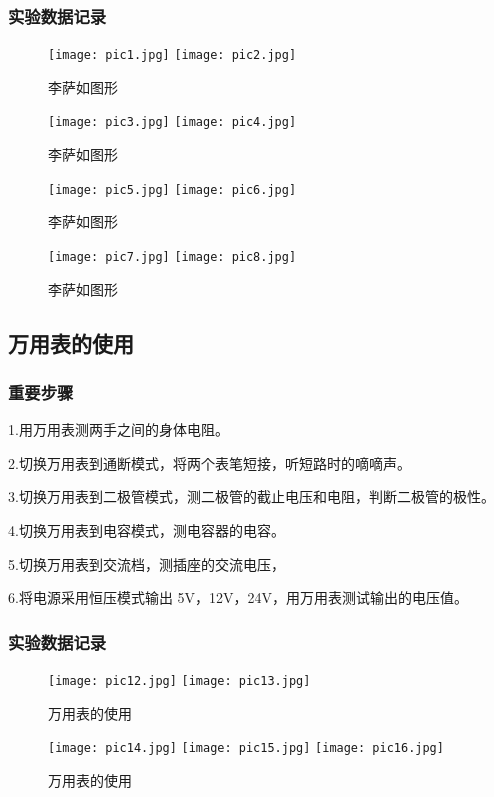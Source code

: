 \documentclass[11pt,a4paper]{article}
\begin{document}
\subsubsection{实验数据记录}
\begin{figure}[H]
    \centering
    \texttt{[image: pic1.jpg]}
    \texttt{[image: pic2.jpg]}
    \caption{李萨如图形}
\end{figure}
\begin{figure}[H]
    \centering
    \texttt{[image: pic3.jpg]}
    \texttt{[image: pic4.jpg]}
    \caption{李萨如图形}
\end{figure}
\begin{figure}[H]
        \centering
        \texttt{[image: pic5.jpg]}
        \texttt{[image: pic6.jpg]}
        \caption{李萨如图形}
\end{figure}
\begin{figure}[H]
        \centering
        \texttt{[image: pic7.jpg]}
        \texttt{[image: pic8.jpg]}
        \caption{李萨如图形}
\end{figure}
\subsection{万用表的使用}
\subsubsection{重要步骤}
1.用万用表测两手之间的身体电阻。

2.切换万用表到通断模式，将两个表笔短接，听短路时的嘀嘀声。

3.切换万用表到二极管模式，测二极管的截止电压和电阻，判断二极管的极性。

4.切换万用表到电容模式，测电容器的电容。

5.切换万用表到交流档，测插座的交流电压，

6.将电源采用恒压模式输出 5V，12V，24V，用万用表测试输出的电压值。
\subsubsection{实验数据记录}
\begin{figure}[H]
    \centering
    \texttt{[image: pic12.jpg]}
    \texttt{[image: pic13.jpg]}
    \caption{万用表的使用}
    
\end{figure}
\begin{figure}[H]
\texttt{[image: pic14.jpg]}
\texttt{[image: pic15.jpg]}
\texttt{[image: pic16.jpg]}
\caption{万用表的使用}   
\end{figure}
\end{document}
